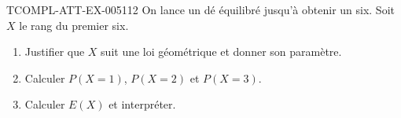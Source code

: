 \begin{exercice}{TCOMPL-ATT-EX-005}{1}{12}
On lance un dé équilibré jusqu'à obtenir un six. Soit $X$ le rang du premier
six.
\begin{enumerate}
  \item Justifier que $X$ suit une loi géométrique et donner son paramètre.
  \item Calculer $P(X=1)$, $P(X=2)$ et $P(X=3)$.
  \item Calculer $E(X)$ et interpréter.
\end{enumerate}
\end{exercice}
